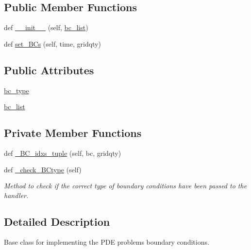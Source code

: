 \subsection*{Public Member Functions}
\begin{DoxyCompactItemize}
\item 
def \hyperlink{classMain__PDE__Repo_1_1src_1_1dirichlet__hand_1_1DirichletHand_a96fcbf0d3e1d031ffcd6002d2af1bdb8}{\+\_\+\+\_\+init\+\_\+\+\_\+} (self, \hyperlink{classMain__PDE__Repo_1_1src_1_1dirichlet__hand_1_1DirichletHand_aa6258cff673f06f2157191486be2d695}{bc\+\_\+list})
\item 
def \hyperlink{classMain__PDE__Repo_1_1src_1_1dirichlet__hand_1_1DirichletHand_ae37d1fb82ac443e9ef86c6f8c6c38250}{set\+\_\+\+B\+Cs} (self, time, gridqty)
\end{DoxyCompactItemize}
\subsection*{Public Attributes}
\begin{DoxyCompactItemize}
\item 
\hyperlink{classMain__PDE__Repo_1_1src_1_1dirichlet__hand_1_1DirichletHand_af2bbe35a00b6a2ef3f192e7250879c0b}{bc\+\_\+type}
\item 
\hyperlink{classMain__PDE__Repo_1_1src_1_1dirichlet__hand_1_1DirichletHand_aa6258cff673f06f2157191486be2d695}{bc\+\_\+list}
\end{DoxyCompactItemize}
\subsection*{Private Member Functions}
\begin{DoxyCompactItemize}
\item 
def \hyperlink{classMain__PDE__Repo_1_1src_1_1dirichlet__hand_1_1DirichletHand_abc40d41b239db08d96641b8ff3229efd}{\+\_\+\+B\+C\+\_\+idxs\+\_\+tuple} (self, bc, gridqty)
\item 
def \hyperlink{classMain__PDE__Repo_1_1src_1_1dirichlet__hand_1_1DirichletHand_aeaf1c49e39ac8e09dfb7195ecb6a8ced}{\+\_\+check\+\_\+\+B\+Ctype} (self)
\begin{DoxyCompactList}\small\item\em Method to check if the correct type of boundary conditions have been passed to the handler. \end{DoxyCompactList}\end{DoxyCompactItemize}


\subsection{Detailed Description}
Base class for implementing the P\+DE problem\textquotesingle{}s boundary conditions. 



